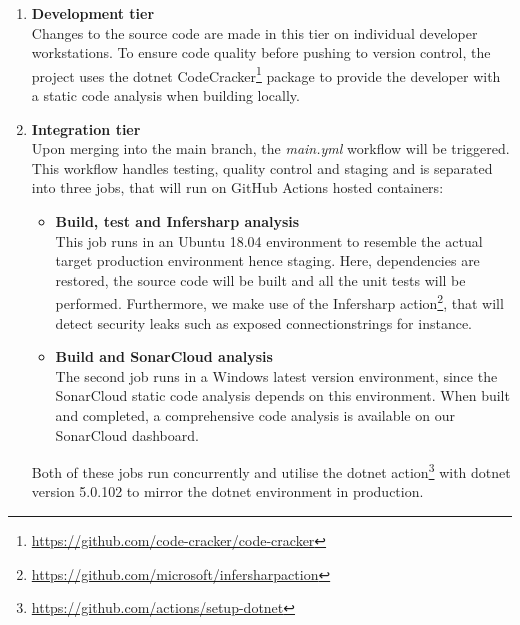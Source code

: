 \documentclass[report/main.tex]{subfiles}
\begin{document}
        \begin{enumerate}
            \item \textbf{Development tier} \\
            Changes to the source code are made in this tier on individual developer workstations. To ensure code quality before pushing to version control, the project uses the dotnet CodeCracker\footnote{\hyperlink{CodeCracker}{https://github.com/code-cracker/code-cracker}} package to provide the developer with a static code analysis when building locally. 
            
            \item \textbf{Integration tier} \\
            Upon merging into the main branch, the \textit{main.yml} workflow will be triggered. This workflow handles testing, quality control and staging and is separated into three jobs, that will run on GitHub Actions hosted containers: 
            
            \begin{itemize}
                \item \textbf{Build, test and Infersharp analysis} \\
                This job runs in an Ubuntu 18.04 environment to resemble the actual target production environment hence staging. Here, dependencies are restored, the source code will be built and all the unit tests will be performed. Furthermore, we make use of the Infersharp action\footnote{\hyperlink{Infersharp action}{https://github.com/microsoft/infersharpaction}}, that will detect security leaks such as exposed connectionstrings for instance.  
                
                \item \textbf{Build and SonarCloud analysis} \\
                The second job runs in a Windows latest version environment, since the SonarCloud static code analysis depends on this environment. When built and completed, a comprehensive code analysis is available on our SonarCloud dashboard. 
                
            \end{itemize}
            
            Both of these jobs run concurrently and utilise the dotnet action\footnote{\hyperlink{dotnet action}{https://github.com/actions/setup-dotnet}} with dotnet version 5.0.102 to mirror the dotnet environment in production. 
            

\end{enumerate}
\end{document}

